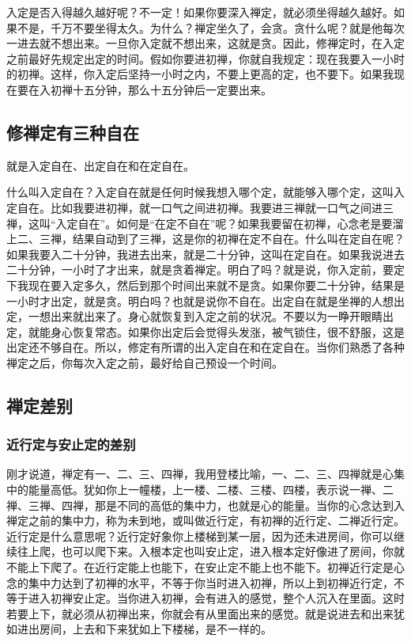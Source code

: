 \documentclass{book}
\begin{document}
入定是否入得越久越好呢？不一定！如果你要深入禅定，就必须坐得越久越好。如果不是，千万不要坐得太久。为什么？禅定坐久了，会贪。贪什么呢？就是他每次一进去就不想出来。一旦你入定就不想出来，这就是贪。因此，修禅定时，在入定之前最好先规定出定的时间。假如你要进初禅，你就自我规定：现在我要入一小时的初禅。这样，你入定后坚持一小时之内，不要上更高的定，也不要下。如果我现在要在入初禅十五分钟，那么十五分钟后一定要出来。

\subsection{修禅定有三种自在}

就是入定自在、出定自在和在定自在。

什么叫入定自在？入定自在就是任何时候我想入哪个定，就能够入哪个定，这叫入定自在。比如我要进初禅，就一口气之间进初禅。我要进三禅就一口气之间进三禅，这叫``入定自在''。如何是``在定不自在''呢？如果我要留在初禅，心念老是要溜上二、三禅，结果自动到了三禅，这是你的初禅在定不自在。什么叫在定自在呢？如果我要入二十分钟，我进去出来，就是二十分钟，这叫在定自在。如果我说进去二十分钟，一小时了才出来，就是贪着禅定。明白了吗？就是说，你入定前，要定下我现在要入定多久，然后到那个时间出来就不是贪。如果你要二十分钟，结果是一小时才出定，就是贪。明白吗？也就是说你不自在。出定自在就是坐禅的人想出定，一想出来就出来了。身心就恢复到入定之前的状况。不要以为一睁开眼睛出定，就能身心恢复常态。如果你出定后会觉得头发涨，被气锁住，很不舒服，这是出定还不够自在。所以，修定有所谓的出入定自在和在定自在。当你们熟悉了各种禅定之后，你每次入定之前，最好给自己预设一个时间。

\subsection{禅定差别}

\subsubsection{近行定与安止定的差别}

刚才说道，禅定有一、二、三、四禅，我用登楼比喻，一、二、三、四禅就是心集中的能量高低。犹如你上一幢楼，上一楼、二楼、三楼、四楼，表示说一禅、二禅、三禅、四禅，那是不同的高低的集中力，也就是心的能量。当你的心念达到入禅定之前的集中力，称为未到地，或叫做近行定，有初禅的近行定、二禅近行定。近行定是什么意思呢？近行定好象你上楼梯到某一层，因为还未进房间，你可以继续往上爬，也可以爬下来。入根本定也叫安止定，进入根本定好像进了房间，你就不能上下爬了。在近行定能上也能下，在安止定不能上也不能下。初禅近行定是心念的集中力达到了初禅的水平，不等于你当时进入初禅，所以上到初禅近行定，不等于进入初禅安止定。当你进入初禅，会有进入的感觉，整个人沉入在里面。这时若要上下，就必须从初禅出来，你就会有从里面出来的感觉。就是说进去和出来犹如进出房间，上去和下来犹如上下楼梯，是不一样的。
\end{document}
